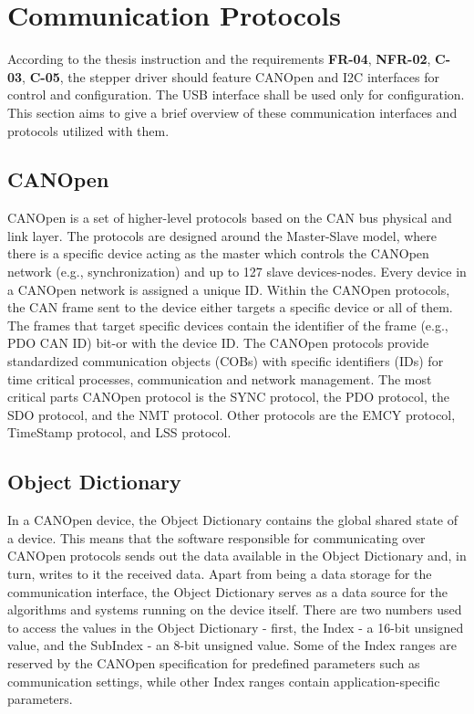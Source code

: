 \section{Communication Protocols}
\label{sec:comm_protocols}
According to the thesis instruction and the requirements \textbf{FR-04}, \textbf{NFR-02}, \textbf{C-03}, \textbf{C-05}, the stepper driver should feature CANOpen and I2C interfaces for control and configuration.
The USB interface shall be used only for configuration.
This section aims to give a brief overview of these communication interfaces and protocols utilized with them.

\subsection{CANOpen}
\label{subsec:canopen}
CANOpen is a set of higher-level protocols based on the CAN bus physical and link layer.
The protocols are designed around the Master-Slave model, where there is a specific device acting as the master which controls the CANOpen network (e.g., synchronization) and up to 127 slave devices-nodes.
Every device in a CANOpen network is assigned a unique ID.
Within the CANOpen protocols, the CAN frame sent to the device either targets a specific device or all of them.
The frames that target specific devices contain the identifier of the frame (e.g., PDO CAN ID) bit-or with the device ID.
The CANOpen protocols provide standardized communication objects (COBs) with specific identifiers (IDs) for time critical processes, communication and network management\cite{can_in_automation_can_2021}.
The most critical parts CANOpen protocol is the SYNC protocol, the PDO protocol, the SDO protocol, and the NMT protocol.
Other protocols are the EMCY protocol, TimeStamp protocol, and LSS protocol.

\subsection{Object Dictionary}
\label{subsec:object_dictionary}
In a CANOpen device, the Object Dictionary contains the global shared state of a device.
This means that the software responsible for communicating over CANOpen protocols sends out the data available in the Object Dictionary and, in turn, writes to it the received data.
Apart from being a data storage for the communication interface, the Object Dictionary serves as a data source for the algorithms and systems running on the device itself.
There are two numbers used to access the values in the Object Dictionary - first, the Index - a 16-bit unsigned value, and the SubIndex - an 8-bit unsigned value.
Some of the Index ranges are reserved by the CANOpen specification for predefined parameters such as communication settings, while other Index ranges contain application-specific parameters\cite{can_in_automation_can_2021}.

